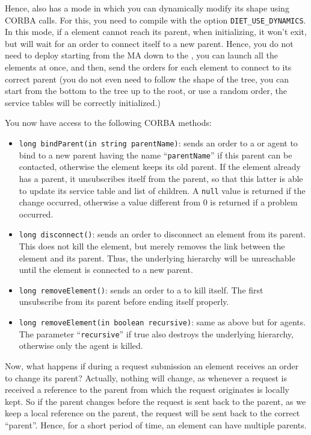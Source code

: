 Hence, \diet also has a mode in which you can dynamically modify its
shape using CORBA calls. For this, you need to compile \diet with the
option \texttt{DIET\_USE\_DYNAMICS}. In this mode, if a \diet element
cannot reach its parent, when initializing, it won't exit, but will
wait for an order to connect itself to a new parent. Hence, you do not
need to deploy \diet starting from the MA down to the \sed, you can
launch all the elements at once, and then, send the orders for each
element to connect to its correct parent (you do not even need to
follow the shape of the tree, you can start from the bottom to the
tree up to the root, or use a random order, the service tables will be
correctly initialized.)

You now have access to the following CORBA methods:
\begin{itemize}
\item \verb|long bindParent(in string parentName)|: sends an order to
  a \sed or agent to bind to a new parent having the name
  ``\verb|parentName|'' if this parent can be contacted, otherwise the
  element keeps its old parent. If the element already has a parent,
  it unsubscribes itself from the parent, so that this latter is able
  to update its service table and list of children. A \texttt{null} value is
  returned if the change occurred, otherwise a value different from 0
  is returned if a problem occurred.

\item \verb|long disconnect()|: sends an order to disconnect an
  element from its parent. This does not kill the element, but merely
  removes the link between the element and its parent. Thus, the
  underlying hierarchy will be unreachable until the element is
  connected to a new parent.

\item \verb|long removeElement()|: sends an order to a \sed to kill
  itself. The \sed first unsubscribe from its parent before ending
  itself properly.

\item \verb|long removeElement(in boolean recursive)|: same as above
  but for agents. The parameter ``\verb|recursive|'' if true also
  destroys the underlying hierarchy, otherwise only the agent is
  killed.
\end{itemize}

Now, what happens if during a request submission an element receives
an order to change its parent? Actually, nothing will change, as
whenever a request is received a reference to the parent from which
the request originates is locally kept. So if the parent changes
before the request is sent back to the parent, as we keep a local
reference on the parent, the request will be sent back to the correct
``parent''. Hence, for a short period of time, an element can have
multiple parents.

